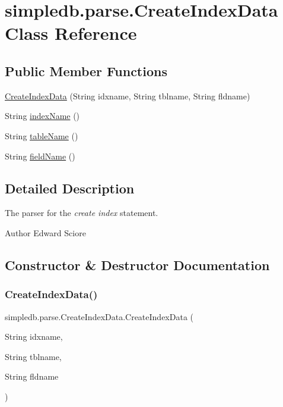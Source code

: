 \hypertarget{classsimpledb_1_1parse_1_1CreateIndexData}{}\section{simpledb.\+parse.\+Create\+Index\+Data Class Reference}
\label{classsimpledb_1_1parse_1_1CreateIndexData}
\subsection*{Public Member Functions}
\begin{DoxyCompactItemize}
\item 
\hyperlink{classsimpledb_1_1parse_1_1CreateIndexData_a4073cefede8ab76fc9527362355440bf}{Create\+Index\+Data} (String idxname, String tblname, String fldname)
\item 
String \hyperlink{classsimpledb_1_1parse_1_1CreateIndexData_a071f39c310d1d8e8ec68401cd0c8a192}{index\+Name} ()
\item 
String \hyperlink{classsimpledb_1_1parse_1_1CreateIndexData_abb99d7f092be7039feb9a948a96b4267}{table\+Name} ()
\item 
String \hyperlink{classsimpledb_1_1parse_1_1CreateIndexData_ac6ba1ae3270633cd14039d6bdacd101f}{field\+Name} ()
\end{DoxyCompactItemize}


\subsection{Detailed Description}
The parser for the {\itshape create index} statement. \begin{DoxyAuthor}{Author}
Edward Sciore 
\end{DoxyAuthor}


\subsection{Constructor \& Destructor Documentation}
\mbox{\label{classsimpledb_1_1parse_1_1CreateIndexData_a4073cefede8ab76fc9527362355440bf}} 
\subsubsection{\texorpdfstring{Create\+Index\+Data()}{CreateIndexData()}}
{\footnotesize\ttfamily simpledb.\+parse.\+Create\+Index\+Data.\+Create\+Index\+Data (\begin{DoxyParamCaption}\item[{String}]{idxname,  }\item[{String}]{tblname,  }\item[{String}]{fldname }\end{DoxyParamCaption})\hspace{0.3cm}{\ttfamily [inline]}}

